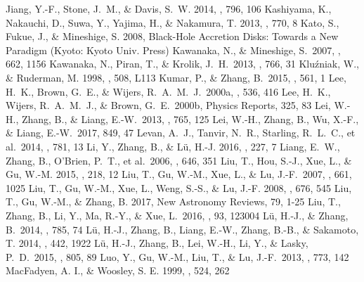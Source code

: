 \documentclass[twocolumn]{aastex6}
\begin{document}
\begin{thebibliography}{}
 Jiang, Y.-F., Stone, J.~M., \& Davis, S.~W. 2014, \apj, 796, 106
 Kashiyama, K., Nakauchi, D., Suwa, Y., Yajima, H., \& Nakamura, T. 2013, \apj, 770, 8
 Kato, S., Fukue, J., \& Mineshige, S. 2008, Black-Hole Accretion Disks: Towards a New Paradigm (Kyoto: Kyoto Univ. Press)
 Kawanaka, N., \& Mineshige, S.\ 2007, \apj, 662, 1156
 Kawanaka, N., Piran, T., \& Krolik, J.~H.\ 2013, \apj, 766, 31
 Klu{\'z}niak, W., \& Ruderman, M. 1998, \apjl, 508, L113
 Kumar, P., \& Zhang, B.\ 2015, \physrep, 561, 1
 Lee, H.~K., Brown, G.~E., \& Wijers, R.~A.~M.~J.\ 2000a, \apj, 536, 416
 Lee, H.~K., Wijers, R.~A.~M.~J., \& Brown, G.~E.\ 2000b, Physics Reports, 325, 83
 Lei, W.-H., Zhang, B., \& Liang, E.-W.\ 2013, \apj, 765, 125
 Lei, W.-H., Zhang, B., Wu, X.-F., \& Liang, E.-W.\ 2017, 849, 47
 Levan, A.~J., Tanvir, N.~R., Starling, R.~L.~C., et al.\ 2014, \apj, 781, 13
 Li, Y., Zhang, B., \& L\"{u}, H.-J. 2016, \apjs, 227, 7
 Liang, E.~W., Zhang, B., O'Brien, P.~T., et al.\ 2006, \apj, 646, 351
 Liu, T., Hou, S.-J., Xue, L., \& Gu, W.-M. 2015, \apjs, 218, 12
 Liu, T., Gu, W.-M., Xue, L., \& Lu, J.-F.\ 2007, \apj, 661, 1025
 Liu, T., Gu, W.-M., Xue, L., Weng, S.-S., \& Lu, J.-F. 2008, \apj, 676, 545
 Liu, T., Gu, W.-M., \& Zhang, B. 2017, New Astronomy Reviews, 79, 1-25
 Liu, T., Zhang, B., Li, Y., Ma, R.-Y., \& Xue, L.\ 2016, \prd, 93, 123004
 L{\"u}, H.-J., \& Zhang, B.\ 2014, \apj, 785, 74
 L{\"u}, H.-J., Zhang, B., Liang, E.-W., Zhang, B.-B., \& Sakamoto, T. 2014, \mnras, 442, 1922
 L{\"u}, H.-J., Zhang, B., Lei, W.-H., Li, Y., \& Lasky, P.~D.\ 2015, \apj, 805, 89
 Luo, Y., Gu, W.-M., Liu, T., \& Lu, J.-F.\ 2013, \apj, 773, 142
 MacFadyen, A. I., \& Woosley, S. E. 1999, \apj, 524, 262

\end{thebibliography}
\end{document}
